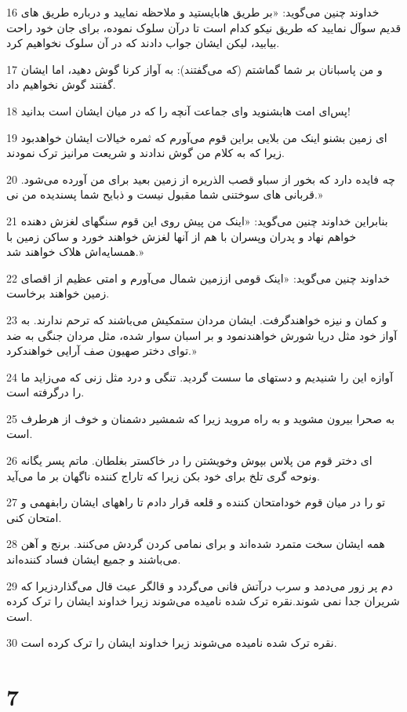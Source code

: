 \par 16 خداوند چنین می‌گوید: «بر طریق هابایستید و ملاحظه نمایید و درباره طریق های قدیم سوآل نمایید که طریق نیکو کدام است تا درآن سلوک نموده، برای جان خود راحت بیابید، لیکن ایشان جواب دادند که در آن سلوک نخواهیم کرد.
\par 17 و من پاسبانان بر شما گماشتم (که می‌گفتند): به آواز کرنا گوش دهید، اما ایشان گفتند گوش نخواهیم داد.
\par 18 پس‌ای امت هابشنوید و‌ای جماعت آنچه را که در میان ایشان است بدانید!
\par 19 ‌ای زمین بشنو اینک من بلایی براین قوم می‌آورم که ثمره خیالات ایشان خواهدبود زیرا که به کلام من گوش ندادند و شریعت مرانیز ترک نمودند.
\par 20 چه فایده دارد که بخور از سباو قصب الذریره از زمین بعید برای من آورده می‌شود. قربانی های سوختنی شما مقبول نیست و ذبایح شما پسندیده من نی.»
\par 21 بنابراین خداوند چنین می‌گوید: «اینک من پیش روی این قوم سنگهای لغزش دهنده خواهم نهاد و پدران وپسران با هم از آنها لغزش خواهند خورد و ساکن زمین با همسایه‌اش هلاک خواهند شد.»
\par 22 خداوند چنین می‌گوید: «اینک قومی اززمین شمال می‌آورم و امتی عظیم از اقصای زمین خواهند برخاست.
\par 23 و کمان و نیزه خواهندگرفت. ایشان مردان ستمکیش می‌باشند که ترحم ندارند. به آواز خود مثل دریا شورش خواهندنمود و بر اسبان سوار شده، مثل مردان جنگی به ضد تو‌ای دختر صهیون صف آرایی خواهندکرد.»
\par 24 آوازه این را شنیدیم و دستهای ما سست گردید. تنگی و درد مثل زنی که می‌زاید ما را درگرفته است.
\par 25 به صحرا بیرون مشوید و به راه مروید زیرا که شمشیر دشمنان و خوف از هرطرف است.
\par 26 ‌ای دختر قوم من پلاس بپوش وخویشتن را در خاکستر بغلطان. ماتم پسر یگانه ونوحه گری تلخ برای خود بکن زیرا که تاراج کننده ناگهان بر ما می‌آید.
\par 27 تو را در میان قوم خودامتحان کننده و قلعه قرار دادم تا راههای ایشان رابفهمی و امتحان کنی.
\par 28 همه ایشان سخت متمرد شده‌اند و برای نمامی کردن گردش می‌کنند. برنج و آهن می‌باشند و جمیع ایشان فساد کننده‌اند.
\par 29 دم پر زور می‌دمد و سرب درآتش فانی می‌گردد و قالگر عبث قال می‌گذاردزیرا که شریران جدا نمی شوند.نقره ترک شده نامیده می‌شوند زیرا خداوند ایشان را ترک کرده است.
\par 30 نقره ترک شده نامیده می‌شوند زیرا خداوند ایشان را ترک کرده است.
 
\chapter{7}

